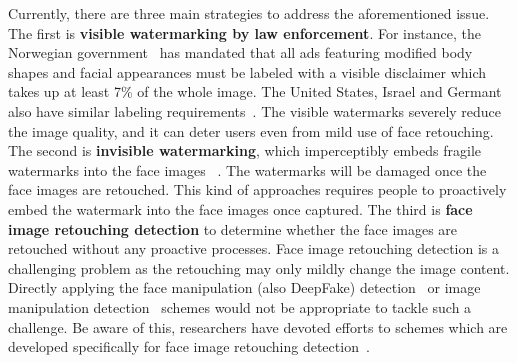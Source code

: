 \documentclass[sigconf]{acmart}
\begin{document}
%

Currently, there are three main strategies to address the aforementioned issue. The first is \textbf{visible watermarking by law enforcement}.
For instance, the Norwegian government~\cite{Norwaylaw} 
has mandated that all ads featuring modified body shapes and facial appearances must be labeled with a visible disclaimer which takes up at least 7\% of the whole image. 
The United States, Israel and Germant also have similar labeling requirements~\cite{USlaw,Israellaw}.
The visible watermarks severely reduce the image quality, and it can deter users even from mild use of face retouching.
The second is \textbf{invisible watermarking}, which imperceptibly embeds fragile watermarks into the face images ~\cite{ying2021image,asnani2022proactive,he2020semi}. The watermarks will be damaged once the face images are retouched. This kind of approaches requires people to proactively embed the watermark into the face images once captured.
The third is \textbf{face image retouching detection} to determine whether the face images are retouched without any proactive processes. Face image retouching detection is a challenging problem as the retouching may only mildly change the image content. Directly applying the face manipulation (also DeepFake) detection~\cite{jain2018detecting,jain2020detecting} or image manipulation detection~\cite{MVSS,mantra} schemes would not be appropriate to tackle such a challenge. Be aware of this, researchers have devoted efforts to schemes which are developed specifically for face image retouching detection~\cite{wang2020deep,rathgeb2020differential}.  

\end{document}
